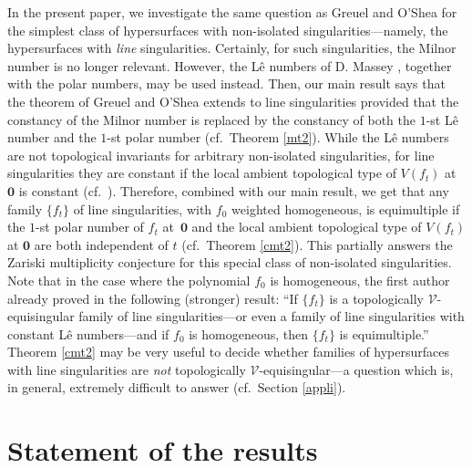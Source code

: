 \documentclass[a4paper,fleqn,11pt]{amsart}
\theoremstyle{definition}
\theoremstyle{remark}
\numberwithin{equation}{section}
\begin{document}
In the present paper, we investigate the same question as Greuel and O'Shea for the simplest class of hypersurfaces with non-isolated singularities---namely, the hypersurfaces with \emph{line} singularities. 
Certainly, for such singularities, the Milnor number is no longer relevant. However, the L\^e numbers of D. Massey \cite{M3,M4,M,M2}, together with the polar numbers, may be used instead.  
Then, our main result says that the theorem of Greuel and O'Shea extends to line singularities provided that the constancy of the Milnor number is replaced by the constancy of both the $1$-st L\^e number and the $1$-st polar number (cf.~Theorem \ref{mt2}). While the L\^e numbers are not topological invariants for arbitrary non-isolated singularities, for line singularities they are constant if the local ambient topological type of $V(f_t)$ at $\mathbf{0}$ is constant (cf.~\cite{M5,M7}). Therefore, combined with our main result, we get that any family $\{f_t\}$ of line singularities, with $f_0$ weighted homogeneous, is equimultiple if the $1$-st polar number of $f_t$ at~$\mathbf{0}$ and the local ambient topological type of $V(f_t)$ at $\mathbf{0}$ are both independent of $t$ (cf.~Theorem \ref{cmt2}). This partially answers the Zariski multiplicity conjecture for this special class of non-isolated singularities. Note that in the case where the polynomial $f_0$ is homogeneous, the first author already proved in \cite{Ey2} the following (stronger) result: ``If $\{f_t\}$ is a topologically $\mathscr{V}$-equisingular family of line singularities---or even a family of line singularities with constant L\^e numbers---and if $f_0$ is homogeneous, then $\{f_t\}$ is equimultiple.'' Theorem \ref{cmt2} may be very useful to decide whether families of hypersurfaces with line singularities are \emph{not} topologically $\mathscr{V}$-equisingular---a question which is, in general, extremely difficult to answer (cf.~Section \ref{appli}).

\section{Statement of the results}\label{sect-sr}
\end{document}
